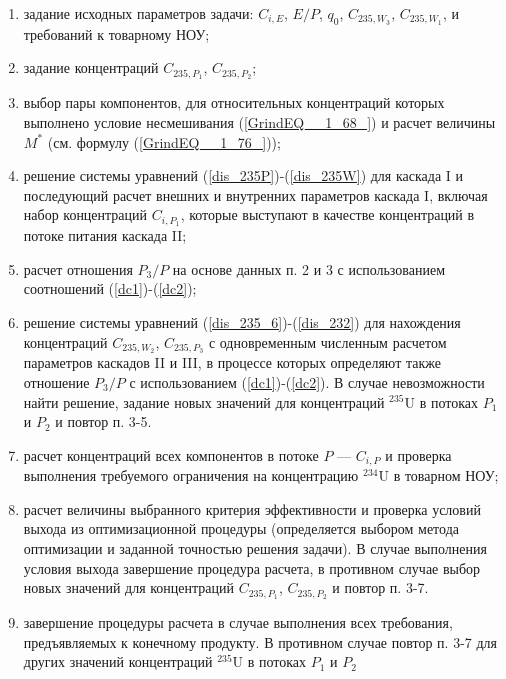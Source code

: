 \begin{enumerate}
    \item задание исходных параметров задачи: $C_{i,E}$, $E/P$, $q_0$, $C_{235,{W_3}}$, $C_{235,{W_1}}$, и требований к товарному НОУ;
    \item задание концентраций $C_{235,{P_1}}$, $C_{235,{P_2}}$;
    \item выбор пары компонентов, для относительных концентраций которых выполнено условие несмешивания (\ref{GrindEQ__1_68_}) и расчет величины $M^{*}$ (см. формулу (\ref{GrindEQ__1_76_}));
    \item решение системы уравнений (\ref{dis_235P})-(\ref{dis_235W}) для каскада I и последующий расчет внешних и внутренних параметров каскада I, включая набор концентраций $C_{i,{P_1}}$, которые выступают в качестве концентраций в потоке питания каскада II;
    \item расчет отношения ${P_3}/P$ на основе данных п. 2 и 3 с использованием соотношений (\ref{dc1})-(\ref{dc2});
    \item решение системы уравнений (\ref{dis_235_6})-(\ref{dis_232}) для нахождения концентраций $C_{235,{W_2}}$, $C_{235,{P_3}}$ с одновременным численным расчетом параметров каскадов II и III, в процессе которых определяют также отношение ${P_3}/P$ с использованием (\ref{dc1})-(\ref{dc2}). В случае невозможности найти решение, задание новых значений для концентраций $^{235}$U в потоках $P_1$ и $P_2$ и повтор п. 3-5. 
    \item расчет концентраций всех компонентов в потоке $P$ --- $C_{i, P}$ и проверка выполнения требуемого ограничения на концентрацию $^{234}$U в товарном НОУ;
    \item расчет величины выбранного критерия эффективности и проверка условий выхода из оптимизационной процедуры (определяется выбором метода оптимизации и заданной точностью решения задачи). В случае выполнения условия выхода завершение процедура расчета, в противном случае выбор новых значений для концентраций $C_{235,{P_1}}$, $C_{235,{P_2}}$ и повтор п. 3-7.
    \item завершение процедуры расчета в случае выполнения всех требования, предъявляемых к конечному продукту. В противном случае повтор п. 3-7 для других значений концентраций $^{235}$U в потоках $P_1$ и $P_2$
\end{enumerate}

